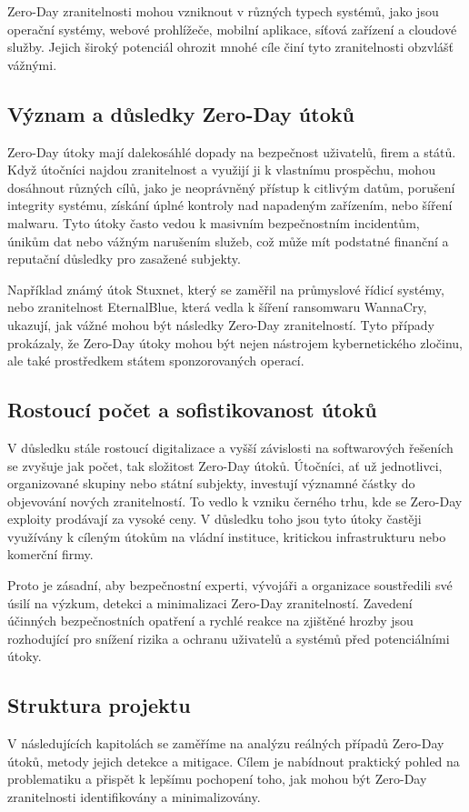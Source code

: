\documentclass[11pt, conference, a4paper]{IEEEtran}
\begin{document}
Zero-Day zranitelnosti mohou vzniknout v různých typech systémů, jako jsou operační systémy, webové prohlížeče, mobilní aplikace, síťová zařízení a cloudové služby. Jejich široký potenciál ohrozit mnohé cíle činí tyto zranitelnosti obzvlášť vážnými.

\subsection{Význam a důsledky Zero-Day útoků}
Zero-Day útoky mají dalekosáhlé dopady na bezpečnost uživatelů, firem a států. Když útočníci najdou zranitelnost a využijí ji k vlastnímu prospěchu, mohou dosáhnout různých cílů, jako je neoprávněný přístup k citlivým datům, porušení integrity systému, získání úplné kontroly nad napadeným zařízením, nebo šíření malwaru. Tyto útoky často vedou k masivním bezpečnostním incidentům, únikům dat nebo vážným narušením služeb, což může mít podstatné finanční a reputační důsledky pro zasažené subjekty.

Například známý útok Stuxnet, který se zaměřil na průmyslové řídicí systémy, nebo zranitelnost EternalBlue, která vedla k šíření ransomwaru WannaCry, ukazují, jak vážné mohou být následky Zero-Day zranitelností. Tyto případy prokázaly, že Zero-Day útoky mohou být nejen nástrojem kybernetického zločinu, ale také prostředkem státem sponzorovaných operací.

\subsection{Rostoucí počet a sofistikovanost útoků}
V důsledku stále rostoucí digitalizace a vyšší závislosti na softwarových řešeních se zvyšuje jak počet, tak složitost Zero-Day útoků. Útočníci, ať už jednotlivci, organizované skupiny nebo státní subjekty, investují významné částky do objevování nových zranitelností. To vedlo k vzniku černého trhu, kde se Zero-Day exploity prodávají za vysoké ceny. V důsledku toho jsou tyto útoky častěji využívány k cíleným útokům na vládní instituce, kritickou infrastrukturu nebo komerční firmy.

Proto je zásadní, aby bezpečnostní experti, vývojáři a organizace soustředili své úsilí na výzkum, detekci a minimalizaci Zero-Day zranitelností. Zavedení účinných bezpečnostních opatření a rychlé reakce na zjištěné hrozby jsou rozhodující pro snížení rizika a ochranu uživatelů a systémů před potenciálními útoky.

\subsection{Struktura projektu}
V následujících kapitolách se zaměříme na analýzu reálných případů Zero-Day útoků, metody jejich detekce a mitigace. Cílem je nabídnout praktický pohled na problematiku a přispět k lepšímu pochopení toho, jak mohou být Zero-Day zranitelnosti identifikovány a minimalizovány.
\end{document}
